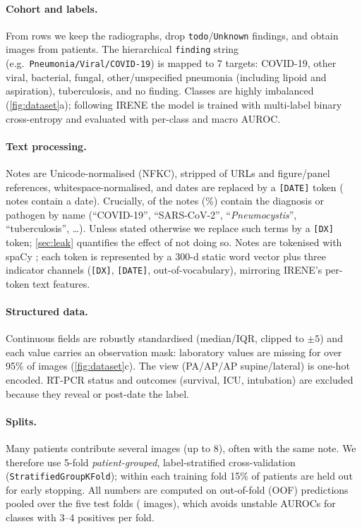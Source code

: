 \paragraph{Cohort and labels.} From \RawRows{} rows we keep the \XrayRows{} radiographs,
drop \texttt{todo}/\texttt{Unknown} findings, and obtain \NImages{} images from \NPatients{}
patients. The hierarchical \texttt{finding} string (e.g.\ \texttt{Pneumonia/Viral/COVID-19})
is mapped to 7 targets: COVID-19, other viral, bacterial, fungal, other/unspecified pneumonia
(including lipoid and aspiration), tuberculosis, and no finding. Classes are highly imbalanced
(\cref{fig:dataset}a); following IRENE the model is trained with multi-label binary
cross-entropy and evaluated with per-class and macro AUROC.

\paragraph{Text processing.} Notes are Unicode-normalised (NFKC), stripped of URLs and
figure/panel references, whitespace-normalised, and dates are replaced by a \texttt{[DATE]}
token (\DateNotes{} notes contain a date). Crucially, \NotesMasked{} of the \NotesWith{} notes
(\PctMasked\%) contain the diagnosis or pathogen by name (``COVID-19'', ``SARS-CoV-2'',
``\emph{Pneumocystis}'', ``tuberculosis'', \dots). Unless stated otherwise we replace
\NMaskedTerms{} such terms by a \texttt{[DX]} token; \cref{sec:leak} quantifies the effect of
not doing so. Notes are tokenised with spaCy \citep{honnibal2020spacy}; each token is
represented by a 300-d static word vector plus three indicator channels
(\texttt{[DX]}, \texttt{[DATE]}, out-of-vocabulary), mirroring IRENE's per-token text features.

\paragraph{Structured data.} Continuous fields are robustly standardised (median/IQR, clipped
to $\pm5$) and each value carries an observation mask: laboratory values are missing for
over 95\% of images (\cref{fig:dataset}c). The view (PA/AP/AP supine/lateral) is one-hot encoded.
RT-PCR status and outcomes (survival, ICU, intubation) are excluded because they reveal or
post-date the label.

\paragraph{Splits.} Many patients contribute several images (up to 8), often with the same
note. We therefore use 5-fold \emph{patient-grouped}, label-stratified cross-validation
(\texttt{StratifiedGroupKFold}); within each training fold 15\% of patients are held out
for early stopping. All numbers are computed on out-of-fold (OOF) predictions pooled over the
five test folds (\NImages{} images), which avoids unstable AUROCs for classes with 3--4
positives per fold.

